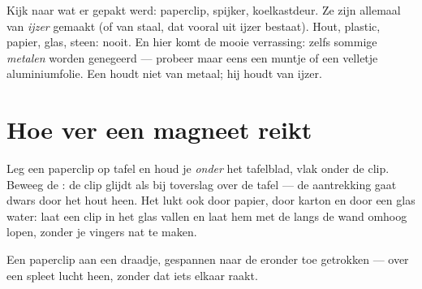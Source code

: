 \begin{example}\label{ex:g1:magnets:iron}
Kijk naar wat er gepakt werd: paperclip, spijker, koelkastdeur. Ze
zijn allemaal van \emph{ijzer} gemaakt (of van staal, dat vooral uit
ijzer bestaat). Hout, plastic, papier, glas, steen: nooit. En hier
komt de mooie verrassing: zelfs sommige \emph{metalen} worden genegeerd
--- probeer maar eens een muntje of een velletje aluminiumfolie. Een
 houdt niet van metaal; hij houdt van ijzer.
\end{example}

\section{Hoe ver een magneet reikt}

\begin{example}\label{ex:g1:magnets:through}
Leg een paperclip op tafel en houd je  \emph{onder} het
tafelblad, vlak onder de clip. Beweeg de : de clip glijdt als
bij toverslag over de tafel --- de aantrekking gaat dwars door het
hout heen. Het lukt ook door papier, door karton en door een glas
water: laat een clip in het glas vallen en laat hem met de
 langs de wand omhoog lopen, zonder je vingers nat te maken.
\end{example}

\begin{omfigure}

{\small Een paperclip aan een draadje, gespannen naar de 
eronder toe getrokken --- over een spleet lucht heen, zonder dat iets
elkaar raakt.}
\end{omfigure}

